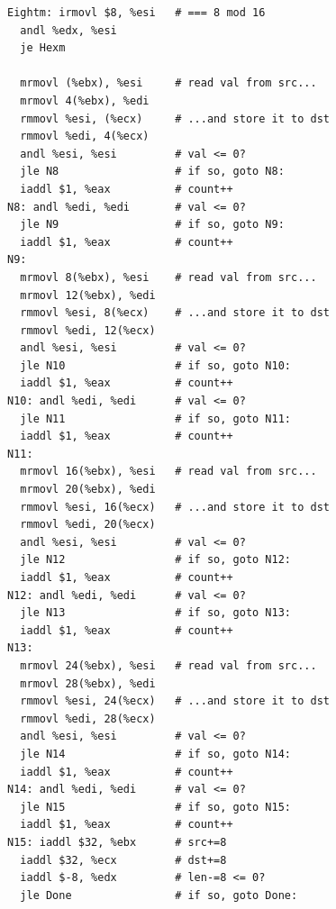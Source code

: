 \documentclass{article}
\begin{document}
\begin{itemize}
\begin{lstlisting}
Eightm: irmovl $8, %esi   # === 8 mod 16
  andl %edx, %esi
  je Hexm

  mrmovl (%ebx), %esi     # read val from src...
  mrmovl 4(%ebx), %edi
  rmmovl %esi, (%ecx)     # ...and store it to dst
  rmmovl %edi, 4(%ecx)  
  andl %esi, %esi         # val <= 0?  
  jle N8                  # if so, goto N8:
  iaddl $1, %eax          # count++
N8: andl %edi, %edi       # val <= 0?  
  jle N9                  # if so, goto N9:
  iaddl $1, %eax          # count++
N9:
  mrmovl 8(%ebx), %esi    # read val from src...
  mrmovl 12(%ebx), %edi
  rmmovl %esi, 8(%ecx)    # ...and store it to dst
  rmmovl %edi, 12(%ecx)  
  andl %esi, %esi         # val <= 0?  
  jle N10                 # if so, goto N10:
  iaddl $1, %eax          # count++
N10: andl %edi, %edi      # val <= 0?  
  jle N11                 # if so, goto N11:
  iaddl $1, %eax          # count++
N11:
  mrmovl 16(%ebx), %esi   # read val from src...
  mrmovl 20(%ebx), %edi
  rmmovl %esi, 16(%ecx)   # ...and store it to dst  
  rmmovl %edi, 20(%ecx)  
  andl %esi, %esi         # val <= 0?  
  jle N12                 # if so, goto N12:
  iaddl $1, %eax          # count++
N12: andl %edi, %edi      # val <= 0?  
  jle N13                 # if so, goto N13:
  iaddl $1, %eax          # count++
N13:
  mrmovl 24(%ebx), %esi   # read val from src...
  mrmovl 28(%ebx), %edi
  rmmovl %esi, 24(%ecx)   # ...and store it to dst  
  rmmovl %edi, 28(%ecx)  
  andl %esi, %esi         # val <= 0?  
  jle N14                 # if so, goto N14:
  iaddl $1, %eax          # count++
N14: andl %edi, %edi      # val <= 0?  
  jle N15                 # if so, goto N15:
  iaddl $1, %eax          # count++
N15: iaddl $32, %ebx      # src+=8
  iaddl $32, %ecx         # dst+=8
  iaddl $-8, %edx         # len-=8 <= 0?
  jle Done                # if so, goto Done:


\end{lstlisting}
\end{itemize}
\end{document}
